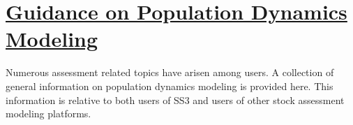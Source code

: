 \hypertarget{PopDyModeling}{}
\section[Guidance on Population Dynamics Modeling]{\protect\hyperlink{PopDyModeling}{Guidance on Population Dynamics Modeling}}

Numerous assessment related topics have arisen among users. A collection of general information on population dynamics modeling is provided here. This information is relative to both users of SS3 and users of other stock assessment modeling platforms.





\pagebreak

